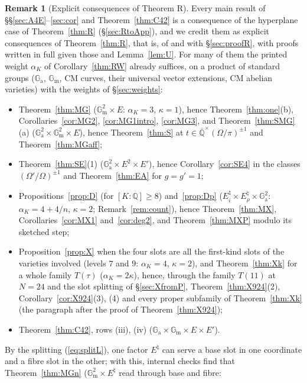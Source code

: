 \documentclass[11pt]{amsart}
\theoremstyle{definition}
\newtheorem{remark}[theorem]{Remark}
\newcommand{\Qb}{\overline{\mathbb{Q}}}
\newcommand{\Q}{\mathbb{Q}}
\newcommand{\Ga}{\mathbb{G}_{\mathrm a}}
\newcommand{\Gm}{\mathbb{G}_{\mathrm m}}
\begin{document}
\begin{remark}[Explicit consequences of Theorem R]\label{rem:explicit}
Every main result of \S\S\ref{sec:A4E}--\ref{sec:cor} and Theorem~\ref{thm:C42} is a consequence of the hyperplane case of
Theorem~\ref{thm:R} (\S\ref{sec:RtoApp}), and we credit them as explicit consequences of Theorem~\ref{thm:R}, that is, of
\cite{RW93} and \cite{W88} with \S\ref{sec:proofR}, with proofs written in full given those and Lemma~\ref{lem:U}. For many of them the printed weight $\alpha_K$ of
Corollary~\ref{thm:RW} already suffices, on a product of standard groups ($\Ga$, $\Gm$, CM curves, their universal vector
extensions, CM abelian varieties) with the weights of \S\ref{sec:weights}:
\begin{itemize}
\item[(i)] Theorem~\ref{thm:MG} ($\Gm^2\times E$: $\alpha_K=3$, $\kappa=1$), hence Theorem~\ref{thm:one}(b), Corollaries~\ref{cor:MG2},
\ref{cor:MG1intro}, \ref{cor:MG3}, and Theorem~\ref{thm:SMG}(a) ($\Ga^2\times\Gm^2\times E$), hence Theorem~\ref{thm:S} at
$t\in\Qb^\times(\Omega/\pi)^{\pm1}$ and Theorem~\ref{thm:MGaff};
\item[(ii)] Theorem~\ref{thm:SE}(1) ($\Ga^2\times E^2\times E'$), hence Corollary~\ref{cor:SE4} in the classes
$(\Omega'/\Omega)^{\pm1}$ and Theorem~\ref{thm:EA} for $g=g'=1$;
\item[(iii)] Propositions~\ref{prop:D} (for $[K:\Q]\ge8$) and~\ref{prop:Dp} ($E_i^\natural\times E_\rho^\natural\times\Ga^2$:
$\alpha_K=4+4/n$, $\kappa=2$; Remark~\ref{rem:count}), hence Theorem~\ref{thm:MX}, Corollaries~\ref{cor:MX1}
and~\ref{cor:deg2}, and Theorem~\ref{thm:MXP} modulo its sketched step;
\item[(iv)] Proposition~\ref{prop:X} when the four slots are all the first-kind slots of the varieties involved (levels $7$ and
$9$: $\alpha_K=4$, $\kappa=2$), and Theorem~\ref{thm:Xk} for a whole family $T(\tau)$ ($\alpha_K=2\kappa$), hence, through the
family $T(11)$ at $N=24$ and the slot splitting of \S\ref{sec:XfromP}, Theorem~\ref{thm:X924}(2), Corollary~\ref{cor:X924}(3),
(4) and every proper subfamily of Theorem~\ref{thm:Xk} (the paragraph after the proof of Theorem~\ref{thm:X924});
\item[(v)] Theorem~\ref{thm:C42}, rows (iii), (iv) ($\Ga\times\Gm\times E\times E'$).
\end{itemize}
By the splitting (\ref{eq:splitL}), one factor $E^\natural$ can serve a base slot in one coordinate and a fibre slot in the
other; with this, internal checks find that Theorem~\ref{thm:MGn} ($\Gm^2\times E^\natural$ read through base and fibre:

\end{remark}
\end{document}
